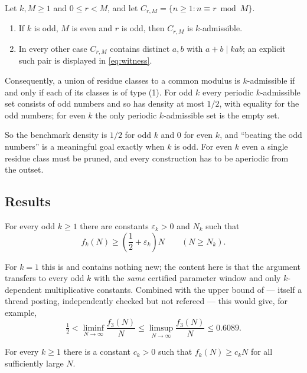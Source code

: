 \documentclass[11pt]{article}
\begin{document}
\begin{theorem}\label{thm:benchmark}
Let \(k,M\geq1\) and \(0\leq r<M\), and let
\(C_{r,M}=\{n\geq1:n\equiv r\bmod M\}\).
\begin{enumerate}
\item If \(k\) is odd, \(M\) is even and \(r\) is odd, then \(C_{r,M}\) is
      \(k\)-admissible.
\item In every other case \(C_{r,M}\) contains distinct \(a,b\) with
      \(a+b\mid kab\); an explicit such pair is displayed in
      \eqref{eq:witness}.
\end{enumerate}
Consequently, a union of residue classes to a common modulus is
\(k\)-admissible if and only if each of its classes is of type (1). For odd
\(k\) every periodic \(k\)-admissible set consists of odd numbers and so has
density at most \(1/2\), with equality for the odd numbers; for even \(k\)
the only periodic \(k\)-admissible set is the empty set.
\end{theorem}

So the benchmark density is \(1/2\) for odd \(k\) and \(0\) for even \(k\),
and ``beating the odd numbers'' is a meaningful goal exactly when \(k\) is
odd. For even \(k\) even a single residue class must be pruned, and every
construction has to be aperiodic from the outset.

\subsection{Results}

\begin{theorem}\label{thm:odd-main}
For every odd \(k\geq1\) there are constants \(\varepsilon_k>0\) and \(N_k\)
such that
\[
 f_k(N)\geq\left(\frac12+\varepsilon_k\right)N
 \qquad(N\geq N_k).
\]
\end{theorem}

For \(k=1\) this is \cite[Theorem 1.1]{DellaPietra2026} and contains nothing
new; the content here is that the argument transfers to every odd \(k\) with
the \emph{same} certified parameter window and only \(k\)-dependent
multiplicative constants. Combined with the upper bound of
\cite{Leon2026} --- itself a thread posting, independently checked but not
refereed --- this would give, for example,
\[
 \tfrac12<\liminf_{N\to\infty}\frac{f_3(N)}{N}
 \leq\limsup_{N\to\infty}\frac{f_3(N)}{N}\leq0.6089 .
\]

\begin{theorem}\label{thm:all-k}
For every \(k\geq1\) there is a constant \(c_k>0\) such that
\(f_k(N)\geq c_kN\) for all sufficiently large \(N\).
\end{theorem}
\end{document}
